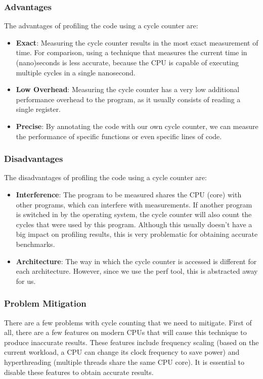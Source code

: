 \documentclass[11pt,a4paper]{report}
\begin{document}
\subsubsection{Advantages}
The advantages of profiling the code using a cycle counter are:
\begin{itemize}
  \item \textbf{Exact}: Measuring the cycle counter results in the most exact measurement of time. For comparison, using a technique that measures the current time in (nano)seconds is less accurate, because the CPU is capable of executing multiple cycles in a single nanosecond.
  \item \textbf{Low Overhead}: Measuring the cycle counter has a very low additional performance overhead to the program, as it usually consists of reading a single register.
  \item \textbf{Precise}: By annotating the code with our own cycle counter, we can measure the performance of specific functions or even specific lines of code.
\end{itemize}

\subsubsection{Disadvantages}
The disadvantages of profiling the code using a cycle counter are:
\begin{itemize}
  \item \textbf{Interference}: The program to be measured shares the CPU (core) with other programs, which can interfere with measurements. If another program is switched in by the operating system, the cycle counter will also count the cycles that were used by this program. Although this usually doesn't have a big impact on profiling results, this is very problematic for obtaining accurate benchmarks.
  \item \textbf{Architecture}: The way in which the cycle counter is accessed is different for each architecture. However, since we use the perf tool, this is abstracted away for us.
\end{itemize}

\subsubsection{Problem Mitigation}
There are a few problems with cycle counting that we need to mitigate. First of all, there are a few features on modern CPUs that will cause this technique to produce inaccurate results. These features include frequency scaling (based on the current workload, a CPU can change its clock frequency to save power) and hyperthreading (multiple threads share the same CPU core). It is essential to disable these features to obtain accurate results.
\end{document}
